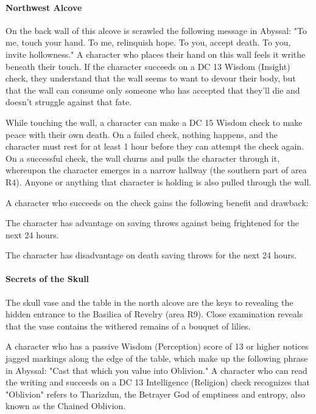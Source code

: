 \documentclass[10pt,a4paper,twoside,twocolumn,openany,nodeprecatedcode]{dndbook}
\begin{document}
\paragraph{Northwest Alcove}
On the back wall of this alcove is scrawled the following message in Abyssal: "To me, touch your hand. To me, relinquish hope. To you, accept death. To you, invite hollowness." A character who places their hand on this wall feels it writhe beneath their touch. If the character succeeds on a DC 13 Wisdom (Insight) check, they understand that the wall seems to want to devour their body, but that the wall can consume only someone who has accepted that they'll die and doesn't struggle against that fate.

While touching the wall, a character can make a DC 15 Wisdom check to make peace with their own death. On a failed check, nothing happens, and the character must rest for at least 1 hour before they can attempt the check again. On a successful check, the wall churns and pulls the character through it, whereupon the character emerges in a narrow hallway (the southern part of area R4). Anyone or anything that character is holding is also pulled through the wall.

A character who succeeds on the check gains the following benefit and drawback:

\begin{DndComment}{}
\begin{description}[nolistsep]
\item[Benefit.]
The character has advantage on saving throws against being frightened for the next 24 hours.
\item[Drawback.]
The character has disadvantage on death saving throws for the next 24 hours.
\end{description}
\end{DndComment}

\paragraph{Secrets of the Skull}
The skull vase and the table in the north alcove are the keys to revealing the hidden entrance to the Basilica of Revelry (area R9). Close examination reveals that the vase contains the withered remains of a bouquet of lilies.

A character who has a passive Wisdom (Perception) score of 13 or higher notices jagged markings along the edge of the table, which make up the following phrase in Abyssal: "Cast that which you value into Oblivion." A character who can read the writing and succeeds on a DC 13 Intelligence (Religion) check recognizes that "Oblivion" refers to Tharizdun, the Betrayer God of emptiness and entropy, also known as the Chained Oblivion.
\end{document}
